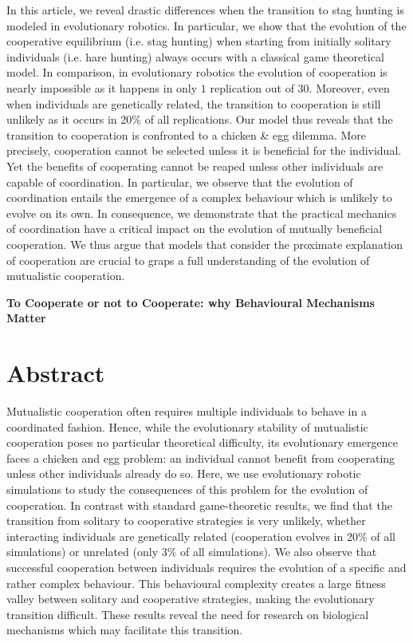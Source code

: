 In this article, we reveal drastic differences when the transition to stag hunting is modeled in evolutionary robotics. In particular, we show that the evolution of the cooperative equilibrium (i.e. stag hunting) when starting from initially solitary individuals (i.e. hare hunting) always occurs with a classical game theoretical model. In comparison, in evolutionary robotics the evolution of cooperation is nearly impossible as it happens in only $1$ replication out of $30$. Moreover, even when individuals are genetically related, the transition to cooperation is still unlikely as it occurs in 20\% of all replications. Our model thus reveals that the transition to cooperation is confronted to a chicken \& egg dilemma. More precisely, cooperation cannot be selected unless it is beneficial for the individual. Yet the benefits of cooperating cannot be reaped unless other individuals are capable of coordination. In particular, we observe that the evolution of coordination entails the emergence of a complex behaviour which is unlikely to evolve on its own. In consequence, we demonstrate that the practical mechanics of coordination have a critical impact on the evolution of mutually beneficial cooperation. We thus argue that models that consider the proximate explanation of cooperation are crucial to graps a full understanding of the evolution of mutualistic cooperation.

\clearpage

\begin{flushleft}
\textbf{\Huge To Cooperate or not to Cooperate: why Behavioural Mechanisms Matter}
\end{flushleft}


\section{Abstract}
  Mutualistic cooperation often requires multiple individuals to behave in a coordinated fashion. Hence, while the evolutionary stability of mutualistic cooperation poses no particular theoretical difficulty, its evolutionary emergence faces a chicken and egg problem: an individual cannot benefit from cooperating unless other individuals already do so. Here, we use evolutionary robotic simulations to study the consequences of this problem for the evolution of cooperation. In contrast with standard game-theoretic results, we find that the transition from solitary to cooperative strategies is very unlikely, whether interacting individuals are genetically related (cooperation evolves in 20\% of all simulations) or unrelated (only 3\% of all simulations). We also observe that successful cooperation between individuals requires the evolution of a specific and rather complex behaviour. This behavioural complexity creates a large fitness valley between solitary and cooperative strategies, making the evolutionary transition difficult. These results reveal the need for research on biological mechanisms which may facilitate this transition.


